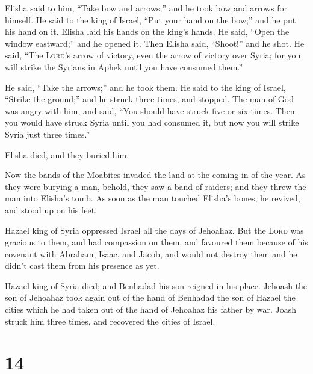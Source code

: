  Elisha said to him, ``Take bow and arrows;'' and he took
bow and arrows for himself.  He said to the king of
Israel, ``Put your hand on the bow;'' and he put his hand on it. Elisha
laid his hands on the king's hands.  He said, ``Open the
window eastward;'' and he opened it. Then Elisha said, ``Shoot!'' and he
shot. He said, ``The \textsc{Lord}'s arrow of victory, even the arrow of
victory over Syria; for you will strike the Syrians in Aphek until you
have consumed them.''

 He said, ``Take the arrows;'' and he took them. He said
to the king of Israel, ``Strike the ground;'' and he struck three times,
and stopped.  The man of God was angry with him, and
said, ``You should have struck five or six times. Then you would have
struck Syria until you had consumed it, but now you will strike Syria
just three times.''

 Elisha died, and they buried him.

Now the bands of the Moabites invaded the land at the coming in of the
year.  As they were burying a man, behold, they saw a
band of raiders; and they threw the man into Elisha's tomb. As soon as
the man touched Elisha's bones, he revived, and stood up on his feet.

 Hazael king of Syria oppressed Israel all the days of
Jehoahaz.  But the \textsc{Lord} was gracious to them,
and had compassion on them, and favoured them because of his covenant
with Abraham, Isaac, and Jacob, and would not destroy them and he didn't
cast them from his presence as yet.

 Hazael king of Syria died; and Benhadad his son reigned
in his place.  Jehoash the son of Jehoahaz took again out
of the hand of Benhadad the son of Hazael the cities which he had taken
out of the hand of Jehoahaz his father by war. Joash struck him three
times, and recovered the cities of Israel.

\hypertarget{section-13}{%
\section{14}\label{section-13}}

